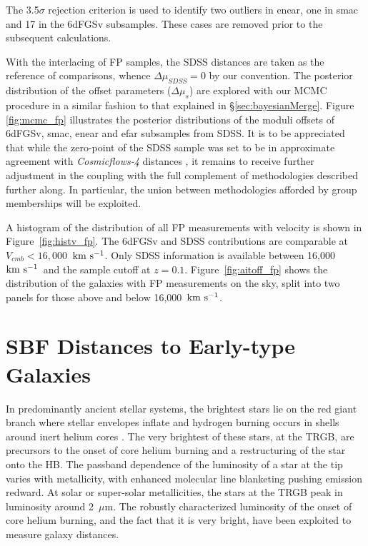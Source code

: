\documentclass[twocolumn]{aastex63}
\newcommand{\kms}{\mbox{${\rm km~s^{-1}}$}}
\begin{document}
The 3.5$\sigma$ rejection criterion is used to identify two outliers in enear, one in smac and 17 in the 6dFGSv subsamples. These cases are removed prior to the subsequent calculations.

With the interlacing of FP samples, the SDSS distances are taken as the reference of comparisons, whence $\Delta \mu_{SDSS} = 0$ by our convention. 
The posterior distribution of the offset parameters ($\Delta \mu_s$) are explored with our MCMC procedure in a similar fashion to that explained in \S \ref{sec:bayesianMerge}. Figure \ref{fig:mcmc_fp} illustrates the posterior distributions of the moduli offsets of 6dFGSv, smac, enear and efar subsamples from SDSS.  It is to be appreciated that while the zero-point of the SDSS sample was set to be in approximate agreement with {\it Cosmicflows-4} distances \citep{2022MNRAS.515..953H}, it remains to receive further adjustment in the coupling with the full complement of methodologies described further along.  In particular, the union between methodologies afforded by group memberships will be exploited.

A histogram of the distribution of all FP measurements with velocity is shown in Figure~\ref{fig:histv_fp}.  The 6dFGSv and SDSS contributions are comparable at $V_{cmb} < 16,000$~\kms.  Only SDSS information is available between 16,000~\kms\ and the sample cutoff at $z=0.1$.  Figure~\ref{fig:aitoff_fp} shows the distribution of the galaxies with FP measurements on the sky, split into two panels for those above and below 16,000~\kms.


\section{SBF Distances to Early-type Galaxies}
\label{sec:sbf}

In predominantly ancient stellar systems, the brightest stars lie on the red giant branch where stellar envelopes inflate and hydrogen burning occurs in shells around inert helium cores \citep{2005essp.book.....S, 2017A&A...606A..33S}.  The very brightest of these stars, at the TRGB, are precursors to the onset of core helium burning and a restructuring of the star onto the HB.  The passband dependence of the luminosity of a star at the tip varies with metallicity, with enhanced molecular line blanketing pushing emission redward. At solar or super-solar metallicities, the stars at the TRGB peak in luminosity around 2~$\mu$m. The robustly characterized luminosity of the onset of core helium burning, and the fact that it is very bright, have been exploited to measure galaxy distances.  
\end{document}
